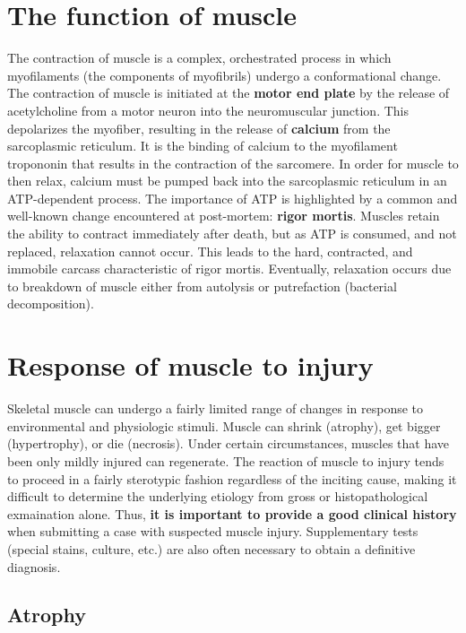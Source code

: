 \documentclass[openany]{book}
\begin{document}
\section{The function of muscle}\label{the-function-of-muscle}

The contraction of muscle is a complex, orchestrated process in which
myofilaments (the components of myofibrils) undergo a conformational
change. The contraction of muscle is initiated at the \textbf{motor end
plate} by the release of acetylcholine from a motor neuron into the
neuromuscular junction. This depolarizes the myofiber, resulting in the
release of \textbf{calcium} from the sarcoplasmic reticulum. It is the
binding of calcium to the myofilament tropononin that results in the
contraction of the sarcomere. In order for muscle to then relax, calcium
must be pumped back into the sarcoplasmic reticulum in an ATP-dependent
process. The importance of ATP is highlighted by a common and well-known
change encountered at post-mortem: \textbf{rigor mortis}. Muscles retain
the ability to contract immediately after death, but as ATP is consumed,
and not replaced, relaxation cannot occur. This leads to the hard,
contracted, and immobile carcass characteristic of rigor mortis.
Eventually, relaxation occurs due to breakdown of muscle either from
autolysis or putrefaction (bacterial decomposition).

\section{Response of muscle to
injury}\label{response-of-muscle-to-injury}

Skeletal muscle can undergo a fairly limited range of changes in
response to environmental and physiologic stimuli. Muscle can shrink
(atrophy), get bigger (hypertrophy), or die (necrosis). Under certain
circumstances, muscles that have been only mildly injured can
regenerate. The reaction of muscle to injury tends to proceed in a
fairly sterotypic fashion regardless of the inciting cause, making it
difficult to determine the underlying etiology from gross or
histopathological exmaination alone. Thus, \textbf{it is important to
provide a good clinical history} when submitting a case with suspected
muscle injury. Supplementary tests (special stains, culture, etc.) are
also often necessary to obtain a definitive diagnosis.

\subsection{Atrophy}\label{atrophy}
\end{document}
